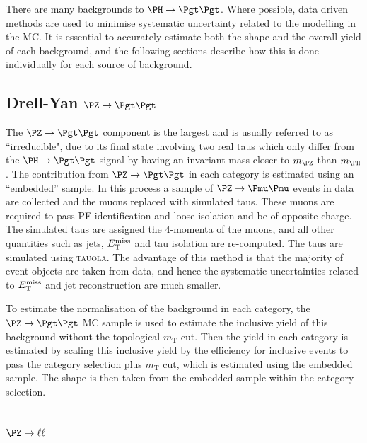 There are many backgrounds to $\HToTauTau$. Where possible, data driven methods
are used to minimise systematic uncertainty related to the modelling in the
\ac{MC}. It is essential to accurately estimate both the shape and the overall
yield of each background, and the following sections describe how this is done
individually for each source of background.

\subsection{Drell-Yan $\PZ \to\Pgt\Pgt$}
\label{sec:backgroundEstimation_Ztautau}

The $\PZ \to \Pgt\Pgt$ component is the largest and is usually referred to as ``irreducible", due to its final
state involving two real taus which only differ from the $\PH \to \Pgt\Pgt$ signal by
having an invariant mass closer to $m_{\PZ}$ than $m_{\PH}$.
The contribution from $\ZToTauTau$ in each category is estimated using an
``embedded'' sample. In this process a sample of $\PZ\to\Pmu\Pmu$ events in data are
collected and the muons replaced with simulated taus. These muons are required
to pass \ac{PF} identification and loose isolation and be of opposite charge.
The simulated taus are assigned the 4-momenta of the muons, and all other
quantities such as jets, $E_{\mathrm{T}}^{\text{miss}}$ and tau isolation are re-computed. The taus
are simulated using \textsc{tauola}. 
The advantage of this method is that the majority of event objects
are taken from data, and hence the systematic uncertainties related to $E_{\mathrm{T}}^{\text{miss}}$
and jet reconstruction are much smaller. 

To estimate the normalisation of the background in each category, 
the $\ZToTauTau$ \ac{MC} sample is used to estimate 
the inclusive yield of this background without the topological $m_{\text{T}}$
cut. Then the yield in each category is estimated by scaling this inclusive yield by the efficiency for 
inclusive events to pass the category selection plus $m_{\text{T}}$ cut, which is estimated using the
embedded sample. The shape is then taken from the embedded sample within the
category selection.


\subsection{$\PZ\to\ell\ell$}
\label{sec:backgroundEstimation_Zll}

